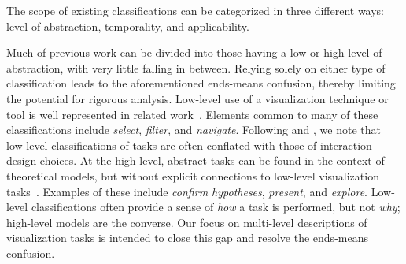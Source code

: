 

The scope of existing classifications can be categorized in three different ways: level of abstraction, temporality, and applicability.

Much of previous work can be divided into those having a low or high level of abstraction, with very little falling in between.
Relying solely on either type of classification leads to the aforementioned ends-means confusion, thereby limiting the potential for rigorous analysis.
Low-level use of a visualization technique or tool is well represented in related work~\cite{Amar2005,Andrienko2006,Buja1996,Casner1991,Chi1998,Chuah1996,Dix1998,Gotz2008,Keim2002,Lee2006,Roth1990,Shneiderman1996,Tweedie1997,Valiati2006,Ward2004,Wehrend1990,Yi2007,Zhou1998}.
Elements common to many of these classifications include {\it select}, {\it filter}, and {\it navigate}.
Following \citet{Lee2012} and \citet{Roth2013}, we note that low-level classifications of tasks are often conflated with those of interaction design choices.
At the high level, abstract tasks can be found in the context of theoretical models, but without explicit connections to low-level visualization tasks~\cite{Amar2004,Card1999,Klein2006,Liu2010,Pirolli2005}.
Examples of these include {\it confirm hypotheses}, {\it present}, and {\it explore}.
Low-level classifications often provide a sense of {\it how} a task is performed, but not {\it why}; high-level models are the converse.
Our focus on multi-level descriptions of visualization tasks is intended to close this gap and resolve the ends-means confusion.

